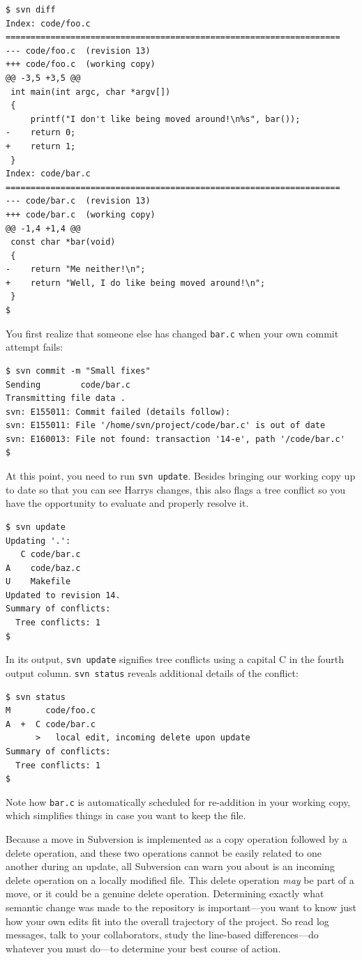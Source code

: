 \begin{verbatim}
$ svn diff
Index: code/foo.c
===================================================================
--- code/foo.c  (revision 13)
+++ code/foo.c  (working copy)
@@ -3,5 +3,5 @@
 int main(int argc, char *argv[])
 {
     printf("I don't like being moved around!\n%s", bar());
-    return 0;
+    return 1;
 }
Index: code/bar.c
===================================================================
--- code/bar.c  (revision 13)
+++ code/bar.c  (working copy)
@@ -1,4 +1,4 @@
 const char *bar(void)
 {
-    return "Me neither!\n";
+    return "Well, I do like being moved around!\n";
 }
$
\end{verbatim}

You first realize that someone else has changed \texttt{bar.c} when your
own commit attempt fails:

\begin{verbatim}
$ svn commit -m "Small fixes"
Sending        code/bar.c
Transmitting file data .
svn: E155011: Commit failed (details follow):
svn: E155011: File '/home/svn/project/code/bar.c' is out of date
svn: E160013: File not found: transaction '14-e', path '/code/bar.c'
$
\end{verbatim}

At this point, you need to run \texttt{svn\ update}. Besides bringing
our working copy up to date so that you can see Harry\textquotesingle s
changes, this also flags a tree conflict so you have the opportunity to
evaluate and properly resolve it.

\begin{verbatim}
$ svn update
Updating '.':
   C code/bar.c
A    code/baz.c
U    Makefile
Updated to revision 14.
Summary of conflicts:
  Tree conflicts: 1
$
\end{verbatim}

In its output, \texttt{svn\ update} signifies tree conflicts using a
capital C in the fourth output column. \texttt{svn\ status} reveals
additional details of the conflict:

\begin{verbatim}
$ svn status
M       code/foo.c
A  +  C code/bar.c
      >   local edit, incoming delete upon update
Summary of conflicts:
  Tree conflicts: 1
$
\end{verbatim}

Note how \texttt{bar.c} is automatically scheduled for re-addition in
your working copy, which simplifies things in case you want to keep the
file.

Because a move in Subversion is implemented as a copy operation followed
by a delete operation, and these two operations cannot be easily related
to one another during an update, all Subversion can warn you about is an
incoming delete operation on a locally modified file. This delete
operation \emph{may} be part of a move, or it could be a genuine delete
operation. Determining exactly what semantic change was made to the
repository is important---you want to know just how your own edits fit
into the overall trajectory of the project. So read log messages, talk
to your collaborators, study the line-based differences---do whatever
you must do---to determine your best course of action.

